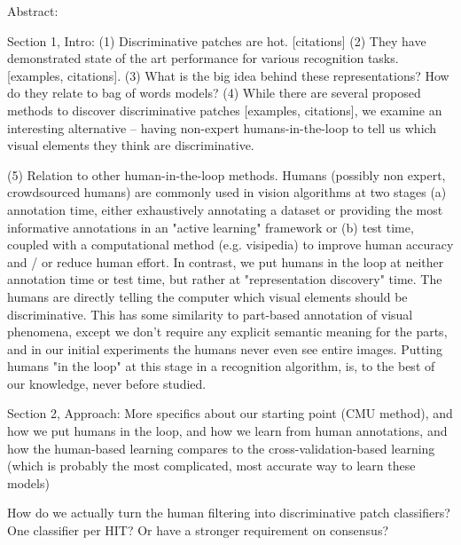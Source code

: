 \documentclass[10pt]{article}%
\begin{document}
\title{}

\author{.}

\maketitle

\begin{abstract}

\end{abstract}

Abstract:

Section 1, Intro:
(1) Discriminative patches are hot. [citations]
(2) They have demonstrated state of the art performance for various recognition tasks. [examples, citations].
(3) What is the big idea behind these representations? How do they relate to bag of words models?
(4) While there are several proposed methods to discover discriminative patches [examples, citations], we examine an interesting alternative -- having non-expert humans-in-the-loop to tell us which visual elements they think are discriminative. 

(5) Relation to other human-in-the-loop methods. Humans (possibly non expert, crowdsourced humans) are commonly used in vision algorithms at two stages (a) annotation time, either exhaustively annotating a dataset or providing the most informative annotations in an "active learning" framework or (b) test time, coupled with a computational method (e.g. visipedia) to improve human accuracy and / or reduce human effort. In contrast, we put humans in the loop at neither annotation time or test time, but rather at "representation discovery" time. The humans are directly telling the computer which visual elements should be discriminative. This has some similarity to part-based annotation of visual phenomena, except we don't require any explicit semantic meaning for the parts, and in our initial experiments the humans never even see entire images. Putting humans "in the loop" at this stage in a recognition algorithm, is, to the best of our knowledge, never before studied.

Section 2, Approach:
More specifics about our starting point (CMU method), and how we put humans in the loop, and how we learn from human annotations, and how the human-based learning compares to the cross-validation-based learning (which is probably the most complicated, most accurate way to learn these models)

How do we actually turn the human filtering into discriminative patch classifiers? One classifier per HIT? Or have a stronger requirement on consensus?
\end{document}
